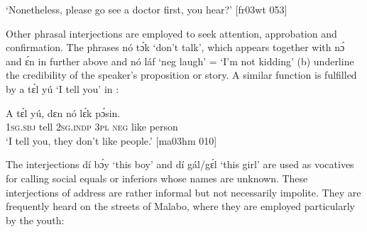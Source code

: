 \glt ‘Nonetheless, please go see a doctor first, you hear?’ [fr03wt 053]
\z


\ea%
    \label{ex:key:1659}
\z\z

Other phrasal interjections are employed to seek attention, approbation and confirmation. The phrases nó tɔ́k ‘don’t talk’, which appears together with nɔ́ and ɛ́n in  further above and nó láf ‘neg laugh’ = ‘I’m not kidding’ (b) underline the credibility of the speaker’s proposition or story. A similar function is fulfilled by a tɛ́l yú ‘I tell you’ in :


\ea%
    \label{ex:key:1660}
\z\z


\ea%
    \label{ex:key:1661}
    \gll A    tɛ́l  yú,    dɛn  nó  lɛ́k  pɔ́sin.\\
\textsc{1sg.sbj}  tell  \textsc{2sg.indp}  \textsc{3pl}  \textsc{neg}  like  person\\

\glt ‘I tell you, they don’t like people.’ [ma03hm 010]
\z

The interjections dí bɔ́y ‘this boy’ and dí gál/gɛ́l ‘this girl’ are used as vocatives{\fff} for calling social equals or inferiors whose names are unknown. These interjections of address are rather informal but not necessarily impolite. They are frequently heard on the streets of Malabo, where they are employed particularly by the youth: 


